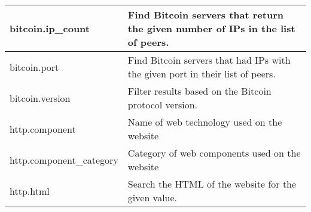 \begin{table}[H]
{\begin{tabular}{|l|l|}
\hline
bitcoin.ip\_count                                                               & Find Bitcoin servers that return the given number of IPs in the list of peers.                                                                                                                                                                                                                                                                                              \\ 
\hline
bitcoin.port                                                                    & Find Bitcoin servers that had IPs with the given port in their list of peers.                                                                                                                                                                                                                                                                                               \\ 
\hline
bitcoin.version                                                                 & Filter results based on the Bitcoin protocol version.                                                                                                                                                                                                                                                                                                                       \\ 
\hline
http.component                                                                  & Name of web technology used on the website                                                                                                                                                                                                                                                                                                                                  \\ 
\hline
http.component\_category                                                        & Category of web components used on the website                                                                                                                                                                                                                                                                                                                              \\ 
\hline
http.html                                                                       & Search the HTML of the website for the given value.                                                                                                                                                                                                                                                                                                                         \\ 

\end{tabular}}
\end{table}
